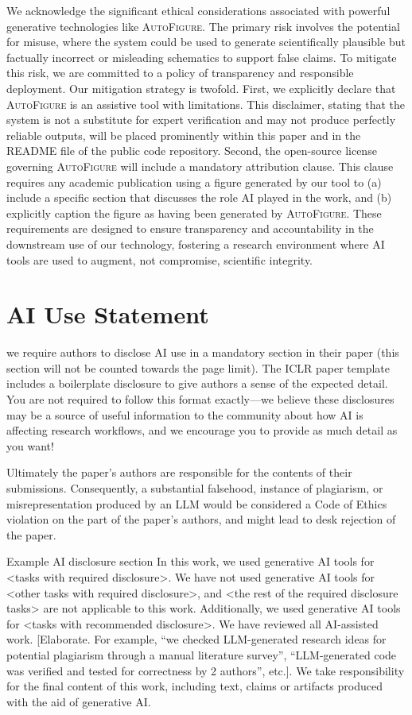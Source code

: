 \documentclass{article} %
\begin{document}
We acknowledge the significant ethical considerations associated with powerful generative technologies like \textsc{AutoFigure}. The primary risk involves the potential for misuse, where the system could be used to generate scientifically plausible but factually incorrect or misleading schematics to support false claims. To mitigate this risk, we are committed to a policy of transparency and responsible deployment. Our mitigation strategy is twofold. First, we explicitly declare that \textsc{AutoFigure} is an assistive tool with limitations. This disclaimer, stating that the system is not a substitute for expert verification and may not produce perfectly reliable outputs, will be placed prominently within this paper and in the README file of the public code repository. Second, the open-source license governing \textsc{AutoFigure} will include a mandatory attribution clause. This clause requires any academic publication using a figure generated by our tool to (a) include a specific section that discusses the role AI played in the work, and (b) explicitly caption the figure as having been generated by \textsc{AutoFigure}. These requirements are designed to ensure transparency and accountability in the downstream use of our technology, fostering a research environment where AI tools are used to augment, not compromise, scientific integrity.

\section{AI Use Statement}

we require authors to disclose AI use in a mandatory section in their paper (this section will not be counted towards the page limit). The ICLR paper template includes a boilerplate disclosure to give authors a sense of the expected detail. You are not required to follow this format exactly—we believe these disclosures may be a source of useful information to the community about how AI is affecting research workflows, and we encourage you to provide as much detail as you want!

Ultimately the paper’s authors are responsible for the contents of their submissions. Consequently, a substantial falsehood, instance of plagiarism, or misrepresentation produced by an LLM would be considered a Code of Ethics violation on the part of the paper’s authors, and might lead to desk rejection of the paper. 

Example AI disclosure section
In this work, we used generative AI tools for <tasks with required disclosure>. We have not used generative AI tools for <other tasks with required disclosure>, and <the rest of the required disclosure tasks> are not applicable to this work. Additionally, we used generative AI tools for <tasks with recommended disclosure>. We have reviewed all AI-assisted work. [Elaborate. For example, “we checked LLM-generated research ideas for potential plagiarism through a manual literature survey”, “LLM-generated code was verified and tested for correctness by 2 authors”, etc.]. We take responsibility for the final content of this work, including text, claims or artifacts produced with the aid of generative AI.
\end{document}
